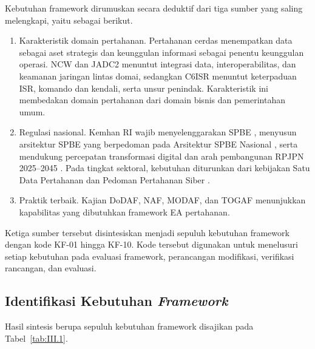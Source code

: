 Kebutuhan framework dirumuskan secara deduktif dari tiga sumber yang saling melengkapi, yaitu sebagai berikut.
\begin{enumerate}[label=\arabic*.]
\item Karakteristik domain pertahanan. Pertahanan cerdas menempatkan data sebagai aset strategis dan keunggulan informasi sebagai penentu keunggulan operasi. NCW dan JADC2 menuntut integrasi data, interoperabilitas, dan keamanan jaringan lintas domai, sedangkan C6ISR menuntut keterpaduan ISR, komando dan kendali, serta unsur penindak. Karakteristik ini membedakan domain pertahanan dari domain bisnis dan pemerintahan umum.
\item Regulasi nasional. Kemhan RI wajib menyelenggarakan SPBE \cite{Perpres95Tahun2018}, menyusun arsitektur SPBE yang berpedoman pada Arsitektur SPBE Nasional \cite{Perpres132Tahun2022}, serta mendukung percepatan transformasi digital \cite{Perpres82Tahun2023} dan arah pembangunan RPJPN 2025–2045 \cite{UU59Tahun2024}. Pada tingkat sektoral, kebutuhan diturunkan dari kebijakan Satu Data Pertahanan \cite{Permenhan1Tahun2023} dan Pedoman Pertahanan Siber \cite{Permenhan82Tahun2014}.
\item Praktik terbaik. Kajian DoDAF, NAF, MODAF, dan TOGAF menunjukkan kapabilitas yang dibutuhkan framework EA pertahanan.
\end{enumerate}

Ketiga sumber tersebut disintesiskan menjadi sepuluh kebutuhan framework dengan kode KF-01 hingga KF-10. Kode tersebut digunakan untuk menelusuri setiap kebutuhan pada evaluasi framework, perancangan modifikasi, verifikasi rancangan, dan evaluasi.

\subsection{Identifikasi Kebutuhan \textit{Framework}}
\label{sec:III.1.2}

Hasil sintesis berupa sepuluh kebutuhan framework disajikan pada Tabel~\ref{tab:III.1}.

